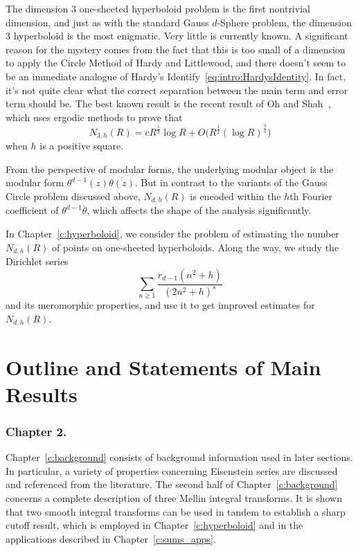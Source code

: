 The dimension $3$ one-sheeted hyperboloid problem is the first nontrivial dimension, and
just as with the standard Gauss $d$-Sphere problem, the dimension $3$ hyperboloid is the
most enigmatic.
Very little is currently known.
A significant reason for the mystery comes from the fact that this is too small of a
dimension to apply the Circle Method of Hardy and Littlewood, and there doesn't seem to be
an immediate analogue of Hardy's Identify~\eqref{eq:intro:HardysIdentity}.
In fact, it's not quite clear what the correct separation between the main term and error
term should be.
The best known result is the recent result of Oh and Shah~\cite{ohshah2014}, which uses
ergodic methods to prove that
\begin{equation}\label{eq:intro:oh_shah}
  N_{3,h}(R) = c R^{\frac{1}{2}} \log R + O\big( R^{\frac{1}{2}} (\log R)^{\frac{3}{4}}
  \big)
\end{equation}
when $h$ is a positive square.



From the perspective of modular forms, the underlying modular object is the modular form
$\theta^{d-1}(z) \overline{\theta(z)}$.
But in contrast to the variants of the Gauss Circle problem discussed above, $N_{d,h}(R)$
is encoded within the $h$th Fourier coefficient of $\theta^{d-1}\overline{\theta}$, which
affects the shape of the analysis significantly.


In Chapter~\ref{c:hyperboloid}, we consider the problem of estimating the number
$N_{d,h}(R)$ of points on one-sheeted hyperboloids.
Along the way, we study the Dirichlet series
\begin{equation}
  \sum_{n \geq 1} \frac{r_{d-1}(n^2 + h)}{(2n^2 + h)^s}
\end{equation}
and its meromorphic properties, and use it to get improved estimates for $N_{d,h}(R)$.




\section{Outline and Statements of Main Results}



\subsubsection*{Chapter 2.}

Chapter~\ref{c:background} consists of background information used in later sections.
In particular, a variety of properties concerning Eisenstein series are discussed and
referenced from the literature.
The second half of Chapter~\ref{c:background} concerns a complete description of three
Mellin integral transforms.
It is shown that two smooth integral transforms can be used in tandem to establish a sharp
cutoff result, which is employed in Chapter~\ref{c:hyperboloid} and in the applications
described in Chapter~\ref{c:sums_apps}.



